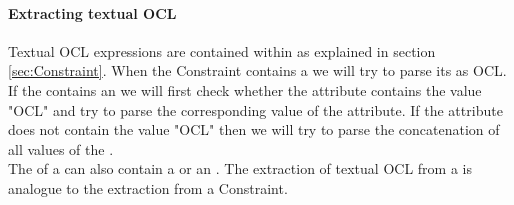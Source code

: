 \paragraph{Extracting textual OCL}
Textual OCL expressions are contained within  as explained in section \ref{sec:Constraint}. When the Constraint contains a  we will try to parse its  as OCL. If the  contains an  we will first check whether the  attribute contains the value "OCL" and try to parse the corresponding value of the  attribute. If the  attribute does not contain the value "OCL" then we will try to parse the concatenation of all  values of the .\\ The  of a  can also contain a  or an . The extraction of textual OCL from a  is analogue to the extraction from a Constraint.
